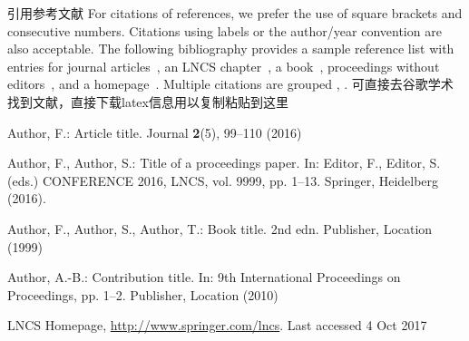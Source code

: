 \documentclass[runningheads]{llncs}
\begin{document}
引用参考文献
For citations of references, we prefer the use of square brackets
and consecutive numbers. Citations using labels or the author/year
convention are also acceptable. The following bibliography provides
a sample reference list with entries for journal
articles~\cite{ref_article1}, an LNCS chapter~\cite{ref_lncs1}, a
book~\cite{ref_book1}, proceedings without editors~\cite{ref_proc1},
and a homepage~\cite{ref_url1}. Multiple citations are grouped
\cite{ref_article1,ref_lncs1,ref_book1},
\cite{ref_article1,ref_book1,ref_proc1,ref_url1}.
%
%
%
% 
% 
%
可直接去谷歌学术找到文献，直接下载latex信息用以复制粘贴到这里
\begin{thebibliography}{8}
Author, F.: Article title. Journal \textbf{2}(5), 99--110 (2016)

Author, F., Author, S.: Title of a proceedings paper. In: Editor,
F., Editor, S. (eds.) CONFERENCE 2016, LNCS, vol. 9999, pp. 1--13.
Springer, Heidelberg (2016). 

Author, F., Author, S., Author, T.: Book title. 2nd edn. Publisher,
Location (1999)

Author, A.-B.: Contribution title. In: 9th International Proceedings
on Proceedings, pp. 1--2. Publisher, Location (2010)

LNCS Homepage, \url{http://www.springer.com/lncs}. Last accessed 4
Oct 2017
\end{thebibliography}
\end{document}
